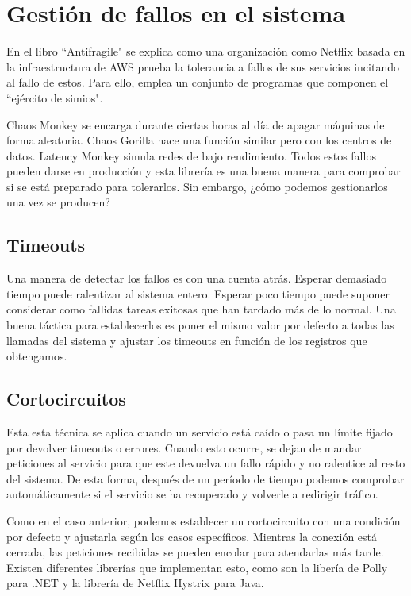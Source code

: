 \documentclass[11pt,a4paper]{article}
\begin{document}
\section{Gestión de fallos en el sistema}

En el libro ``Antifragile" se explica como una organización como Netflix basada en la infraestructura de AWS prueba la tolerancia a fallos de sus servicios incitando al fallo de estos. Para ello, emplea un conjunto de programas que componen el ``ejército de simios". 

Chaos Monkey se encarga durante ciertas horas al día de apagar máquinas de forma aleatoria. Chaos Gorilla hace una función similar pero con los centros de datos. Latency Monkey simula redes de bajo rendimiento. Todos estos fallos pueden darse en producción y esta librería es una buena manera para comprobar si se está preparado para tolerarlos. Sin embargo, ¿cómo podemos gestionarlos una vez se producen?

\subsection{Timeouts}

Una manera de detectar los fallos es con una cuenta atrás. Esperar demasiado tiempo puede ralentizar al sistema entero. Esperar poco tiempo puede suponer considerar como fallidas tareas exitosas que han tardado más de lo normal. Una buena táctica para establecerlos es poner el mismo valor por defecto a todas las llamadas del sistema y ajustar los timeouts en función de los registros que obtengamos.

\subsection{Cortocircuitos}

Esta esta técnica se aplica cuando un servicio está caído o pasa un límite fijado por devolver timeouts o errores. Cuando esto ocurre, se dejan de mandar peticiones al servicio para que este devuelva un fallo rápido y no ralentice al resto del sistema. De esta forma, después de un período de tiempo podemos comprobar automáticamente si el servicio se ha recuperado y volverle a redirigir tráfico.

Como en el caso anterior, podemos establecer un cortocircuito con una condición por defecto y ajustarla según los casos específicos. Mientras la conexión está cerrada, las peticiones recibidas se pueden encolar para atendarlas más tarde. Existen diferentes librerías que implementan esto, como son la libería de Polly para .NET y la librería de Netflix Hystrix para Java.
\end{document}
